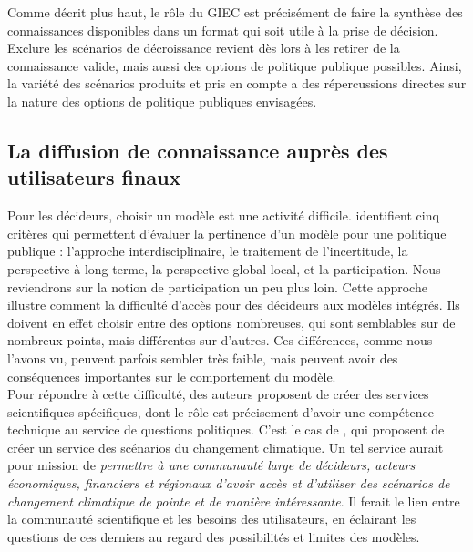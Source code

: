 Comme décrit plus haut, le rôle du GIEC est précisément de faire la synthèse des connaissances disponibles dans un format qui soit utile à la prise de décision. Exclure les scénarios de décroissance revient dès lors à les retirer de la connaissance valide, mais aussi des options de politique publique possibles. Ainsi, la variété des scénarios produits et pris en compte a des répercussions directes sur la nature des options de politique publiques envisagées. 

\subsection{La diffusion de connaissance auprès des utilisateurs finaux}

Pour les décideurs, choisir un modèle est une activité difficile. \cite{boulanger_models_2005} identifient cinq critères qui permettent d'évaluer la pertinence d'un modèle pour une politique publique : l'approche interdisciplinaire, le traitement de l'incertitude, la perspective à long-terme, la perspective global-local, et la participation. Nous reviendrons sur la notion de participation un peu plus loin. Cette approche illustre comment la difficulté d'accès pour des décideurs aux modèles intégrés. Ils doivent en effet choisir entre des options nombreuses, qui sont semblables sur de nombreux points, mais différentes sur d'autres. Ces différences, comme nous l'avons vu, peuvent parfois sembler très faible, mais peuvent avoir des conséquences importantes sur le comportement du modèle. \\


Pour répondre à cette difficulté, des auteurs proposent de créer des services scientifiques spécifiques, dont le rôle est précisement d'avoir une compétence technique au service de questions politiques. C'est le cas de \cite{auer_climate_2021}, qui proposent de créer un service des scénarios du changement climatique. Un tel service aurait pour mission de \emph{permettre à une communauté large de décideurs, acteurs économiques, financiers et régionaux d'avoir accès et d'utiliser des scénarios de changement climatique de pointe et de manière intéressante}. Il ferait le lien entre la communauté scientifique et les besoins des utilisateurs, en éclairant les questions de ces derniers au regard des possibilités et limites des modèles. \\

